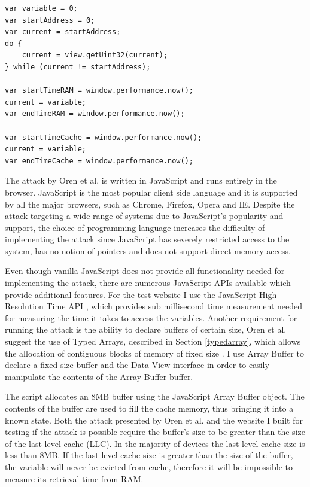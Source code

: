 \documentclass[10pt,a4paper,twoside]{book}
\begin{document}
\begin{lstlisting}[caption={Code for comparing access times from RAM vs Cache},label={orentest},  xleftmargin=0.7cm]
var variable = 0;
var startAddress = 0;
var current = startAddress;
do {
	current = view.getUint32(current);
} while (current != startAddress);

var startTimeRAM = window.performance.now();
current = variable;
var endTimeRAM = window.performance.now();

var startTimeCache = window.performance.now();
current = variable;
var endTimeCache = window.performance.now();
\end{lstlisting}

The attack by Oren et al. \cite{oren2015spy} is written in JavaScript and runs entirely in the browser. JavaScript is the most popular client side language and it is supported by all the major browsers, such as Chrome, Firefox, Opera and IE. Despite the attack targeting a wide range of systems due to JavaScript's popularity and support, the choice of programming language increases the difficulty of implementing the attack since JavaScript has severely restricted access to the system, has no notion of pointers and does not support direct memory access.

Even though vanilla JavaScript does not provide all functionality needed for implementing the attack, there are numerous JavaScript APIs available which provide additional features. For the test website I use the JavaScript High Resolution Time API \cite{jshighresolutiontimeapi}, which provides sub millisecond time measurement needed for measuring the time it takes to access the variables. Another requirement for running the attack is the ability to declare buffers of certain size, Oren et al. suggest the use of Typed Arrays, described in Section \ref{typedarray}, which allows the allocation of contiguous blocks of memory of fixed size \cite{typedarrays}. I use Array Buffer \cite{arraybuffer} to declare a fixed size buffer and the Data View \cite{dataview} interface in order to easily manipulate the contents of the Array Buffer buffer. 

The script allocates an 8MB buffer using the JavaScript Array Buffer object. The contents of the buffer are used to fill the cache memory, thus bringing it into a known state. Both the attack presented by Oren et al. \cite{oren2015spy} and the website I built for testing if the attack is possible require the buffer's size to be greater than the size of the last level cache (LLC). In the majority of devices the last level cache size is less than 8MB. If the last level cache size is greater than the size of the buffer, the variable will never be evicted from cache, therefore it will be impossible to measure its retrieval time from RAM.
\end{document}
